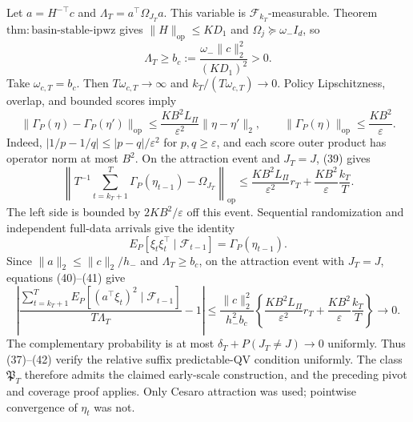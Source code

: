 Let \(a=H^{-\top}c\) and \(\Lambda_T=a^\top\Omega_{J_T}a\). This variable is \(\mathcal F_{k_T}\)-measurable. Theorem \(\mathrm{thm:basin\text{-}stable\text{-}ipwz}\) gives \(\|H\|_{\mathrm{op}}\le KD_1\) and \(\Omega_j\succeq\omega_-I_d\), so
\[
 \Lambda_T\ge b_c:=\frac{\omega_-\|c\|_2^2}{(KD_1)^2}>0.
\tag{38}
\]
Take \(\omega_{c,T}=b_c\). Then \(T\omega_{c,T}\to\infty\) and \(k_T/(T\omega_{c,T})\to0\). Policy Lipschitzness, overlap, and bounded scores imply
\[
 \|\Gamma_P(\eta)-\Gamma_P(\eta')\|_{\mathrm{op}}
 \le\frac{KB^2L_\Pi}{\varepsilon^2}\|\eta-\eta'\|_2,
 \qquad \|\Gamma_P(\eta)\|_{\mathrm{op}}\le\frac{KB^2}{\varepsilon}.
\tag{39}
\]
Indeed, \(|1/p-1/q|\le|p-q|/\varepsilon^2\) for \(p,q\ge\varepsilon\), and each score outer product has operator norm at most \(B^2\). On the attraction event and \(J_T=J\), (39) gives
\[
 \left\|T^{-1}\sum_{t=k_T+1}^T\Gamma_P(\eta_{t-1})-\Omega_{J_T}\right\|_{\mathrm{op}}
 \le \frac{KB^2L_\Pi}{\varepsilon^2}r_T
 +\frac{KB^2}{\varepsilon}\frac{k_T}{T}.
\tag{40}
\]
The left side is bounded by \(2KB^2/\varepsilon\) off this event. Sequential randomization and independent full-data arrivals give the identity
\[
 E_P[\xi_t\xi_t^\top\mid\mathcal F_{t-1}]
 =\Gamma_P(\eta_{t-1}).
\tag{41}
\]
Since \(\|a\|_2\le\|c\|_2/h_-\) and \(\Lambda_T\ge b_c\), on the attraction event with \(J_T=J\), equations (40)--(41) give
\[
 \left|
 \frac{\sum_{t=k_T+1}^TE_P[(a^\top\xi_t)^2\mid\mathcal F_{t-1}]}
 {T\Lambda_T}-1
 \right|
 \le
 \frac{\|c\|_2^2}{h_-^2b_c}
 \left\{
 \frac{KB^2L_\Pi}{\varepsilon^2}r_T+
 \frac{KB^2}{\varepsilon}\frac{k_T}{T}
 \right\}\longrightarrow0.
\tag{42}
\]
The complementary probability is at most \(\delta_T+P(J_T\ne J)\to0\) uniformly. Thus (37)--(42) verify the relative suffix predictable-QV condition uniformly. The class \(\mathfrak P_T\) therefore admits the claimed early-scale construction, and the preceding pivot and coverage proof applies. Only Cesaro attraction was used; pointwise convergence of \(\eta_t\) was not.